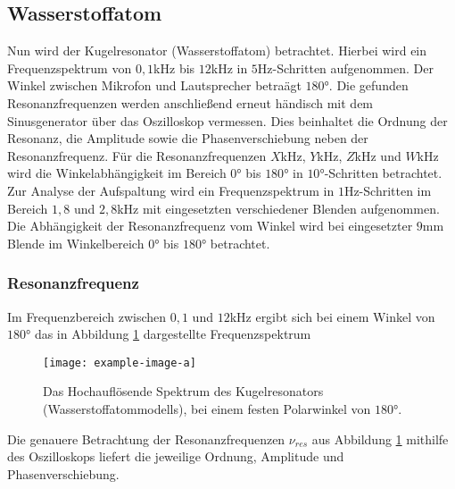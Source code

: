 \subsection{Wasserstoffatom}
Nun wird der Kugelresonator (Wasserstoffatom) betrachtet. Hierbei wird ein Frequenzspektrum
von $0,1$kHz bis $12$kHz in $5$Hz-Schritten aufgenommen. Der Winkel zwischen Mikrofon und Lautsprecher betraägt $180°$.
Die gefunden Resonanzfrequenzen werden anschließend erneut händisch mit dem Sinusgenerator über das Oszilloskop vermessen.
Dies beinhaltet die Ordnung der Resonanz, die Amplitude sowie die Phasenverschiebung neben der Resonanzfrequenz.
Für die Resonanzfrequenzen $X$kHz, $Y$kHz, $Z$kHz und $W$kHz wird die Winkelabhängigkeit im Bereich $0°$ bis $180°$ in $10°$-Schritten betrachtet.\\
Zur Analyse der Aufspaltung wird ein Frequenzspektrum in $1$Hz-Schritten im Bereich $1,8$ und $2,8$kHz mit eingesetzten
verschiedener Blenden aufgenommen. Die Abhängigkeit der Resonanzfrequenz vom Winkel wird bei eingesetzter $9$mm Blende 
im Winkelbereich $0°$ bis $180°$ betrachtet.

\subsubsection*{Resonanzfrequenz}
Im Frequenzbereich zwischen $0,1$ und $12$kHz ergibt sich bei einem Winkel von $180°$ das in Abbildung \ref{fig:kugel_res}
dargestellte Frequenzspektrum

\begin{figure}
    \center
    \texttt{[image: example-image-a]}%
    \caption{Das Hochauflösende Spektrum des Kugelresonators (Wasserstoffatommodells), bei einem 
    festen Polarwinkel von $180°$.}
    \label{fig:kugel_res}
\end{figure}

Die genauere Betrachtung der Resonanzfrequenzen $\nu_{res}$ aus Abbildung \ref{fig:kugel_res} mithilfe des Oszilloskops
liefert die jeweilige Ordnung, Amplitude und Phasenverschiebung.

